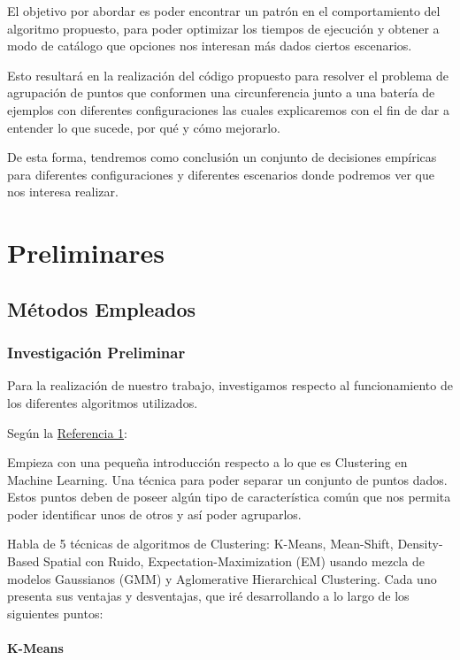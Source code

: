 \documentclass[conference,a4paper]{IEEEtran}
\begin{document}
El objetivo por abordar es poder encontrar un patrón en el comportamiento del algoritmo propuesto, para poder optimizar los tiempos de ejecución y obtener a modo de catálogo que opciones nos interesan más dados ciertos escenarios.

Esto resultará en la realización del código propuesto para resolver el problema de agrupación de puntos que conformen una circunferencia junto a una batería de ejemplos con diferentes configuraciones las cuales explicaremos con el fin de dar a entender lo que sucede, por qué y cómo mejorarlo.

De esta forma, tendremos como conclusión un conjunto de decisiones empíricas para diferentes configuraciones y diferentes escenarios donde podremos ver que nos interesa realizar.


\section{Preliminares}

\subsection{Métodos Empleados}

\subsubsection{Investigación Preliminar}

Para la realización de nuestro trabajo, investigamos respecto al funcionamiento de los diferentes algoritmos utilizados.

Según la  \hyperref[bib:georgeSeif]{Referencia 1}:

Empieza con una pequeña introducción respecto a lo que es Clustering en Machine Learning. Una técnica para poder separar un conjunto de puntos dados. Estos puntos deben de poseer algún tipo de característica común que nos permita poder identificar unos de otros y así poder agruparlos.

Habla de 5 técnicas de algoritmos de Clustering: K-Means, Mean-Shift, Density-Based Spatial con Ruido, Expectation-Maximization (EM) usando mezcla de modelos Gaussianos (GMM) y Aglomerative Hierarchical Clustering. Cada uno presenta sus ventajas y desventajas, que iré desarrollando a lo largo de los siguientes puntos:

\paragraph{\textbf{K-Means}}
\end{document}
